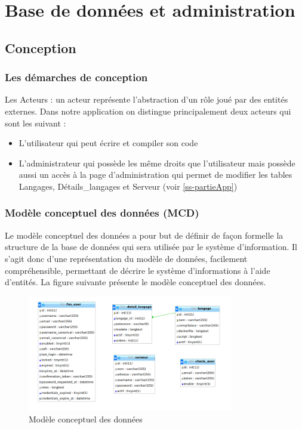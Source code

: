\chapter{Base de données et administration}
\label{ch-bdd-admin}


\section{Conception}

\subsection{Les démarches de conception}

\par Les Acteurs : un acteur représente l’abstraction d’un rôle joué par des entités externes. Dans notre application on distingue principalement deux acteurs qui sont les suivant :

\begin{itemize}
\item L'utilisateur qui peut écrire et compiler son code
\item L'administrateur qui possède les même droits que l'utilisateur mais possède aussi un accès à la page d'administration qui permet de modifier les tables Langages, Détails\_langages et Serveur (voir \ref{ss-partieApp})
\end{itemize}

\subsection{Modèle conceptuel des données (MCD)}
 
\par Le modèle conceptuel des données a pour but de définir de façon formelle la structure de la base de données qui sera utilisée par le système d'information. Il s'agit donc d'une représentation du modèle de données, facilement compréhensible, permettant de décrire le système d'informations à l'aide d'entités. 
La figure suivante présente le modèle conceptuel des données.

\begin{figure}[H]
\centering
\includegraphics[width=0.8\textwidth]{./img/BDD.png}
\caption{Modèle conceptuel des données}
\end{figure}


